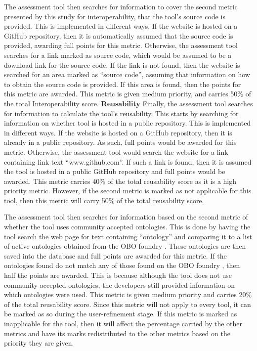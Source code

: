 \documentclass{cisfyp}
\begin{document}
The assessment tool then searches for information to cover the second metric presented by this study for interoperability, that the tool's source code is provided. This is implemented in different ways. If the website is hosted on a GitHub repository, then it is automatically assumed that the source code is provided, awarding full points for this metric. Otherwise, the assessment tool searches for a link marked as source code, which would be assumed to be a download link for the source code. If the link is not found, then the website is searched for an area marked as ``source code'', assuming that information on how to obtain the source code is provided. If this area is found, then the points for this metric are awarded. This metric is given medium priority, and carries 50\% of the total Interoperability score.\newline
\textbf{Reusability}\newline
Finally, the assessment tool searches for information to calculate the tool's reusability. This starts by searching for information on whether tool is hosted in a public repository. This is implemented in different ways. If the website is hosted on a GitHub repository, then it is already in a public repository. As such, full points would be awarded for this metric. Otherwise, the assessment tool would search the website for a link containing link text ``www.github.com''. If such a link is found, then it is assumed the tool is hosted in a public GitHub repository and full points would be awarded. This metric carries 40\% of the total reusability score as it is a high priority metric. However, if the second metric is marked as not applicable for this tool, then this metric will carry 50\% of the total reusability score.

The assessment tool then searches for information based on the second metric of whether the tool uses community accepted ontologies. This is done by having the tool search the web page for text containing ``ontology'' and comparing it to a list of active ontologies obtained from the OBO foundry \cite{obo}. These ontologies are then saved into the database and full points are awarded for this metric. If the ontologies found do not match any of those found on the OBO foundry \cite{obo}, then half the points are awarded. This is because although the tool does not use community accepted ontologies, the developers still provided information on which ontologies were used. This metric is given medium priority and carries 20\% of the total reusability score. Since this metric will not apply to every tool, it can be marked as so during the user-refinement stage. If this metric is marked as inapplicable for the tool, then it will affect the percentage carried by the other metrics and have its marks redistributed to the other metrics based on the priority they are given.
\end{document}
